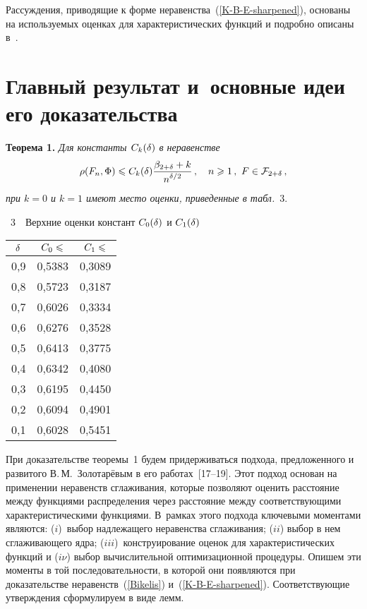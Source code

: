 \begin{multicols}{2}
Рассуждения, приводящие к форме неравенства~(\ref{K-B-E-sharpened}),
основаны на используемых оценках для характеристических функций и
подробно описаны в~\cite{KorolevShevtsova2010, KorolevShevtsova2009}.

\section{Главный результат и~основные идеи его доказательства}

\noindent
\textbf{Теорема 1.}
\textit{Для константы $C_k(\delta)$ в неравенстве}
$$
\ud\le
\exlowk(\d)\fr{\bet+k}{n^{\d/2}}\,,\quad n\ge1\,,\ F\in\F_{2+\d}\,,
$$
\textit{при $k=0$ и $k=1$ имеют место оценки, приведенные в
табл.}~3.

\medskip

\begin{center} %
\noindent
\parbox{56mm}{{\tablename~3}\ \ \small{Верхние оценки
констант $C_0(\delta)$ и $C_1(\delta)$}}
\vspace*{4pt}

{\small 
\tabcolsep=16pt
\begin{tabular}{|c|c|c|}
  \hline $\delta$ & $C_0\leqslant$ & $C_1\leqslant$ \\
\hline
0,9 & 0,5383 &  0,3089  \\
0,8 & 0,5723 &  0,3187  \\
0,7 & 0,6026 &  0,3334  \\
0,6 & 0,6276 &  0,3528  \\
0,5 & 0,6413 &  0,3775  \\
0,4 & 0,6342 &  0,4080  \\
0,3 & 0,6195 &  0,4450  \\
0,2 & 0,6094 &  0,4901  \\
0,1 & 0,6028 &  0,5451  \\
  \hline
\end{tabular}
}
\end{center}

\addtocounter{table}{1}

\bigskip




При доказательстве теоремы~1 будем придерживаться
подхода, предложенного и развитого В.\,М.~Золотарёвым в его
работах~[17--19]. Этот
подход основан на применении неравенств сглаживания, которые
позволяют оценить расстояние между функциями распределения через
расстояние между соответствующими характеристическими функциями. 
В~рамках этого подхода ключевыми моментами являются: ($i$)~выбор
надлежащего неравенства сглаживания; ($ii$) выбор в нем сглаживающего
ядра; ($iii$)~конструирование оценок для характеристических функций и
($i\nu$) выбор вычислительной оптимизационной процедуры. Опишем эти
моменты в той последовательности, в которой они появляются при
доказательстве неравенств~(\ref{Bikelis}) и~(\ref{K-B-E-sharpened}).
Соответствующие утверждения сформулируем в виде лемм.
{

}
\end{multicols}
